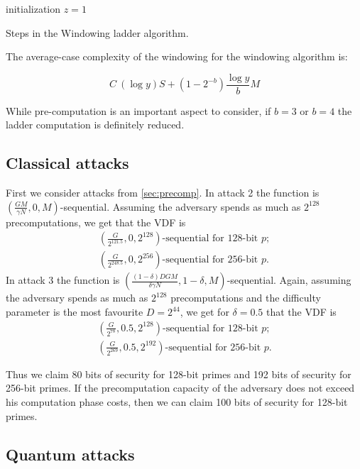 \documentclass{article}
\begin{document}
\begin{algorithm}[H]
 
 initialization $z=1$\;
 \caption{Steps in the Windowing ladder algorithm.}
\end{algorithm}

The average-case complexity of the windowing for the windowing algorithm is:

$$C ~ (\log y)S + (1 - 2^{-b})\frac{\log y}{b}M$$

While pre-computation is an important aspect to consider, if $b=3$ or $b=4$ the ladder computation is definitely reduced.

 
 \subsection{Classical attacks}
 
 First we consider attacks from \cref{sec:precomp}. In attack 2 the function is $(\frac{GM}{\gamma N},0,M)$-sequential. Assuming the adversary spends as much as $2^{128}$ precomputations, we get that the VDF is
\begin{align}
(\frac{G}{2^{121.5}},0,2^{128})\text{-sequential for 128-bit }p;\\
(\frac{G}{2^{248.5}},0,2^{256})\text{-sequential for 256-bit }p.
\end{align}
In attack 3 the function is  $\left(\frac{(1-\delta)DGM}{ \delta\gamma N},1-\delta,M\right)$-sequential. Again, assuming the adversary spends as much as $2^{128}$ precomputations
and the difficulty parameter is the most favourite $D=2^{44}$, we get for $\delta=0.5$ that the VDF is
\begin{align}
(\frac{G}{2^{78}},0.5,2^{128})\text{-sequential for 128-bit }p;\\
(\frac{G}{2^{269}},0.5,2^{192})\text{-sequential for 256-bit }p.
\end{align}

Thus we claim 80 bits of security for 128-bit primes and 192 bits of security for 256-bit primes. If the precomputation capacity of the adversary does not exceed his computation phase costs, then we can claim 100 bits of security for 128-bit primes.


\subsection{ Quantum attacks}
\end{document}
